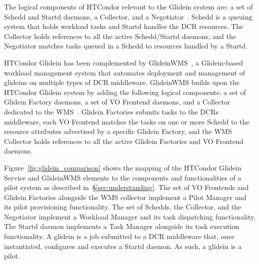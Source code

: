 \documentclass{sig-alternate}
\begin{document}

The logical components of HTCondor relevant to the Glidein system are: a set of
Schedd and Startd daemons, a Collector, and a
Negotiator~\cite{glidein_presentation_url}. Schedd is a queuing system that
holds workload tasks and Startd handles the DCR resources. The Collector holds
references to all the active Schedd/Startd daemons, and the Negotiator matches
tasks queued in a Schedd to resources handled by a Startd.

HTCondor Glidein has been complemented by
GlideinWMS~\cite{sfiligoi2008glideinwms}, a Glidein-based workload management
system that automates deployment and management of glideins on multiple types of
DCR middleware. GlideinWMS builds upon the HTCondor Glidein system by adding the
following logical components: a set of Glidein Factory daemons, a set of VO
Frontend daemons, and a Collector dedicated to the
WMS~\cite{glideinwms_url,glideinwms_manual_url}. Glidein Factories submits tasks
to the DCRs middleware, each VO Frontend matches the tasks on one or more Schedd
to the resource attributes advertised by a specific Glidein Factory, and the WMS
Collector holds references to all the active Glidein Factories and VO Frontend
daemons.


Figure~\ref{fig:glidein_comparison} shows the mapping of the HTCondor Glidein
Service and GlideinWMS elements to the components and functionalities of a pilot
system as described in~\S\ref{sec:understanding}. The set of VO Frontends and
Glidein Factories alongside the WMS collector implement a Pilot Manager and its
pilot provisioning functionality. The set of Schedds, the Collector, and the
Negotiator implement a Workload Manager and its task dispatching functionality.
The Startd daemon implements a Task Manager alongside its task execution
functionality. A glidein is a job submitted to a DCR middleware that, once
instantiated, configures and executes a Startd daemon. As such, a glidein is a
pilot.
\end{document}

